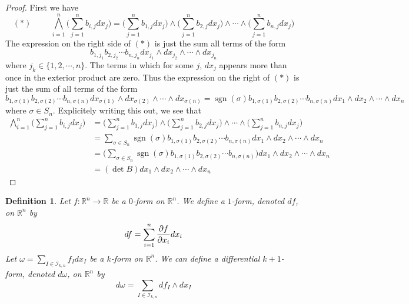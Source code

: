 \documentclass[12pt]{amsart}
\newtheorem{defn}[thm]{Definition}
\newcommand{\sig}{\sigma}
\newcommand{\om}{\omega}
\newcommand{\R}{\mathbb{R}}
\newcommand{\MI}{\mathcal{I}}
\DeclareMathOperator{\sgn}{sgn}
\begin{document}
	\begin{proof}
		First we have $$ (*) \hspace{1cm} \bigwedge_{i=1}^n \bigg(\sum_{j=1}^n b_{i,j}dx_j\bigg) =\bigg(\sum_{j=1}^n b_{1,j}dx_j\bigg) \wedge \bigg(\sum_{j=1}^n b_{2,j}dx_j\bigg) \wedge \cdots \wedge \bigg(\sum_{j=1}^n b_{n,j}dx_j\bigg)$$ The expression on the right side of $(*)$ is just the sum all terms of the form $$b_{1,j_1}b_{2,j_2} \cdots b_{n,j_n} dx_{j_1}\wedge  dx_{j_2} \wedge \cdots \wedge  dx_{j_n}$$ where $j_k \in \{1,2,\cdots,n\}$. The terms in which for some $j$, $dx_j$ appears more than once in the exterior product are zero. Thus the expression on the right of $(*)$ is just the sum of all terms of the form $$b_{1,\sig(1)}b_{2,\sig(2)} \cdots b_{n,\sig(n)} dx_{\sig(1)}\wedge  dx_{\sig(2)} \wedge \cdots \wedge  dx_{\sig(n)} = \sgn(\sig) b_{1,\sig(1)}b_{2,\sig(2)} \cdots b_{n,\sig(n)} dx_1 \wedge dx_2 \wedge \cdots \wedge dx_n$$
		where $\sig \in S_n$. Explicitely writing this out, we see that 
		\begin{align*}
			\bigwedge_{i=1}^n \bigg(\sum_{j=1}^n b_{i,j}dx_j\bigg)
			&= \bigg(\sum_{j=1}^n b_{1,j}dx_j\bigg) \wedge \bigg(\sum_{j=1}^n b_{2,j}dx_j\bigg) \wedge \cdots \wedge \bigg(\sum_{j=1}^n b_{n,j}dx_j\bigg) \\
			&= \sum_{\sig \in S_n} \sgn(\sig) b_{1,\sig(1)}b_{2,\sig(2)} \cdots b_{n,\sig(n)} dx_1 \wedge dx_2 \wedge \cdots \wedge dx_n \\
			&= \bigg( \sum_{\sig \in S_n} \sgn(\sig) b_{1,\sig(1)}b_{2,\sig(2)} \cdots b_{n,\sig(n)}\bigg) dx_1 \wedge dx_2 \wedge \cdots \wedge dx_n \\
			&= (\det B) dx_1 \wedge dx_2 \wedge \cdots \wedge dx_n
		\end{align*}
	\end{proof}

	\begin{defn}
		Let $f: \R^n \rightarrow \R$ be a $0$-form on $\R^n$. We define a $1$-form, denoted $df$, on $\R^n$ by $$df = \sum_{i = 1}^n \pdv{f}{x_i} dx_i$$
		Let $\om = \sum\limits_{I \in \MI_{k,n}} f_Idx_I$ be a $k$-form on $\R^n$. We can define a differential $k+1$-form, denoted $d \om$, on $\R^n$ by $$d\om = \sum\limits_{I \in \MI_{k,n}} df_I\wedge dx_I$$  
	\end{defn}
\end{document}
